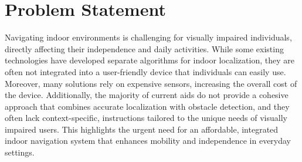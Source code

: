\section{Problem Statement}
Navigating indoor environments is challenging for visually impaired individuals, directly affecting their independence and daily activities. While some existing technologies have developed separate algorithms for indoor localization, they are often not integrated into a user-friendly device that individuals can easily use. Moreover, many solutions rely on expensive sensors, increasing the overall cost of the device. Additionally, the majority of current aids do not provide a cohesive approach that combines accurate localization with obstacle detection, and they often lack context-specific, instructions tailored to the unique needs of visually impaired users. This highlights the urgent need for an affordable, integrated indoor navigation system that enhances mobility and independence in everyday settings.